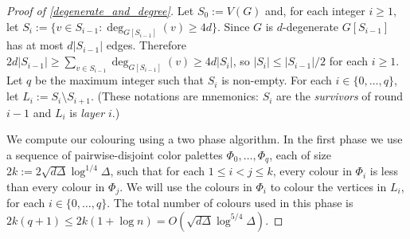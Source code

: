 \documentclass{patmorin}
\newcommand{\defin}[1]{\emph{\color{brightmaroon}#1}}
\begin{document}
\begin{proof}[Proof of \cref{degenerate_and_degree}]
  Let $S_0:=V(G)$ and, for each integer $i\ge 1$, let $S_i:=\{v\in S_{i-1}:\deg_{G[S_{i-1}]}(v)\ge 4d\}$.  Since $G$ is $d$-degenerate $G[S_{i-1}]$ has at most $d|S_{i-1}|$ edges.  Therefore $2d|S_{i-1}|\ge \sum_{v\in S_{i-1}} \deg_{G[S_{i-1}]}(v)\ge 4d|S_i|$, so $|S_i|\le |S_{i-1}|/2$ for each $i\ge 1$.  Let $q$ be the maximum integer such that $S_i$ is non-empty.  For each $i\in\{0,\ldots,q\}$, let $L_i:=S_i\setminus S_{i+1}$.  (These notations are mnemonics: $S_i$ are the \defin{survivors} of round $i-1$ and $L_i$ is \defin{layer} $i$.)

  We compute our colouring using a two phase algorithm. In the first phase we use a sequence of pairwise-disjoint color palettes $\Phi_0,\ldots,\Phi_{q}$, each of size $2k:=2\sqrt{d\Delta}\log^{1/4}\Delta$, such that for each $1\le i < j\le k$, every colour in $\Phi_i$ is less than every colour in $\Phi_j$.  We will use the colours in $\Phi_i$ to colour the vertices in $L_i$, for each $i\in\{0,\ldots,q\}$.  The total number of colours used in this phase is $2k(q+1)\le 2k(1+\log n)=O(\sqrt{d\Delta}\log^{5/4}\Delta)$.



\end{proof}
\end{document}
